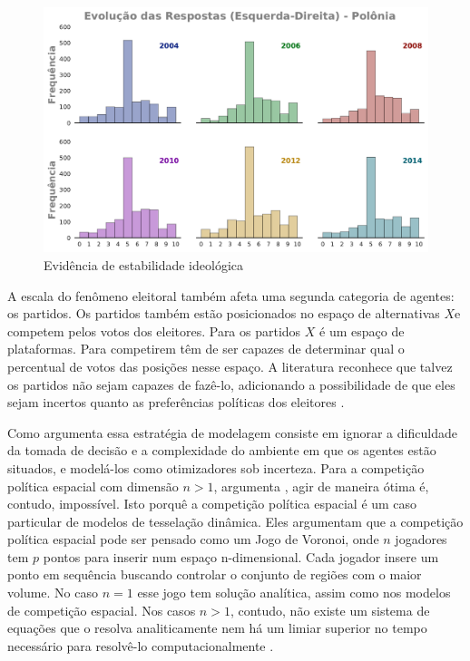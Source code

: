 \begin{figure}[H]
  \centering \includegraphics[width = \textwidth]{ims/ess_Pol_plots.pdf}
  \caption{Evidência de estabilidade ideológica}
\end{figure}

A escala do fenômeno eleitoral também afeta uma segunda categoria de agentes: os
partidos. Os partidos também estão posicionados no espaço de alternativas \(X\)e
competem pelos votos dos eleitores. Para os partidos \(X\) é um espaço de
plataformas. Para competirem têm de ser capazes de determinar qual o percentual
de votos das posições nesse espaço. A literatura reconhece que talvez os
partidos não sejam capazes de fazê-lo, adicionando a possibilidade de que eles
sejam incertos quanto as preferências políticas dos eleitores
\cite{glazer1989model, grofman2004downs}.


Como argumenta  essa estratégia de modelagem
consiste em ignorar a dificuldade da tomada de decisão e a complexidade do
ambiente em que os agentes estão situados, e modelá-los como otimizadores sob
incerteza. Para a competição política espacial com dimensão $n>1$, argumenta
, agir de maneira ótima é, contudo, impossível. Isto
porquê a competição política espacial é um caso particular de modelos de
tesselação dinâmica. Eles argumentam que a competição política espacial pode ser
pensado como um Jogo de Voronoi, onde \(n\) jogadores tem \(p\) pontos para
inserir num espaço n-dimensional. Cada jogador insere um ponto em sequência
buscando controlar o conjunto de regiões com o maior volume. No caso \(n=1\)
esse jogo tem solução analítica, assim como nos modelos de competição espacial.
Nos casos \(n>1\), contudo, não existe um sistema de equações que o resolva
analiticamente nem há um limiar superior no tempo necessário para resolvê-lo
computacionalmente \cite[p.24]{laver2011party}.

